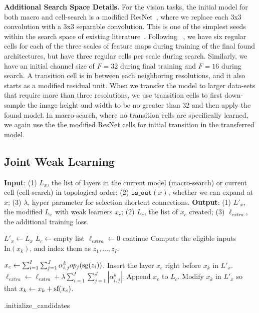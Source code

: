 \textbf{Additional Search Space Details.}
For the vision tasks, the initial model for both macro and cell-search is a modified ResNet~\citep{resnet}, where we replace each 3x3 convolution with a 3x3 separable convolution. This is one of the simplest seeds within the search space of existing literature~\citep{NASCell,Pham2018EfficientNA,Liu2018DARTSDA}.  Following ~\citep{NASCell}, we have six regular cells for each of the three scales of feature maps during training of the final found architectures, 
but have three regular cells per scale during search. Similarly, we have an initial channel size of $F=32$ during final training and $F=16$ during search. 
A transition cell is in between each neighboring resolutions, and it also starts as a modified residual unit. 
When we transfer the model to larger data-sets that require more than three resolutions, we use transition cells to first down-sample the image height and width to be no greater than 32 and then apply the found model. In macro-search, where no transition cells are specifically learned, we again use the the modified ResNet cells for initial transition in the transferred model.


\subsection{Joint Weak Learning}
\label{sec:candidate_init_and_select}

\begin{algorithm}[t]
\begin{algorithmic}[1]
\STATE \textbf{Input}: 
(1) $L_x$, the list of layers in the current model (macro-search) or current cell (cell-search) in topological order;
(2) $\texttt{is\_out}(x)$, whether we can expand at $x$;
(3) $\lambda$, hyper parameter for selection shortcut connections. 
\STATE \textbf{Output}: (1) $L'_x$, the modified $L_x$ with weak learners $x_c$; 
(2) $L_c$, the list of $x_c$ created;
(3) $\ell_{extra}$, the additional training loss.

\STATE $L'_x \leftarrow L_x$
\STATE $L_c \leftarrow \text{empty list}$
\STATE $\ell_{extra} \leftarrow 0$ 
        \STATE continue
    \ENDIF
    \STATE Compute the eligible inputs $\text{In}(x_{k})$, and index them as $z_1,...,z_I$.

    \STATE $x_c \leftarrow \sum _{i=1}^I \sum _{j=1}^J  \alpha^k_{i,j}op_j(\textrm{sg} (z_i))$.
    \label{algline:add_sg}
\STATE Insert the layer $x_c$ right before $x_{k}$ in $L'_x$.
\STATE $\ell_{extra} \leftarrow \ell_{extra} + \lambda \sum _{i=1}^I \sum _{j=1}^J |\alpha^k_{i,j}|$.
\STATE Append $x_c$ to $L_c$.
\STATE Modify $x_{k}$ in $L'_x$ so that $x_{k} \leftarrow x_{k} + \textrm{sf} (x_c)$.
\label{algline:add_sf}
\ENDFOR
\end{algorithmic}
\caption{\Petridish .initialize\_candidates}
\label{alg:candidate_init}
\end{algorithm}

